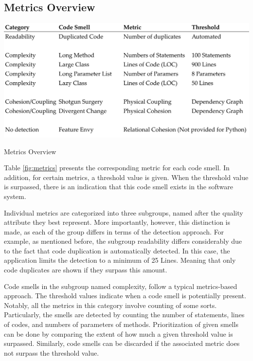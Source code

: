 \subsection{Metrics Overview}

\begin{table}[htp]
    \centering
    \includegraphics[width=\textwidth]{./assets/smell_overview}
    \label{fig:metrics}
    \caption{Metrics Overview}
\end{table}

Table \ref{fig:metrics} presents the corresponding metric for each code smell. In addition, for certain metrics, a threshold value is given. When the threshold value is surpassed, there is an indication that this code smell exists in the software system.

Individual metrics are categorized into three subgroups, named after the quality attribute they best represent. More importantly, however, this distinction is made, as each of the group differs in terms of the detection approach. For example, as mentioned before, the subgroup readability differs considerably due to the fact that code duplication is automatically detected. In this case, the application limits the detection to a minimum of 25 Lines. Meaning that only code duplicates are shown if they surpass this amount. 

Code smells in the subgroup named complexity, follow a typical metrics-based approach. The threshold values indicate when a code smell is potentially present. Notably, all the metrics in this category involve counting of some sorts. Particularly, the smells are detected by counting the number of statements, lines of codes, and numbers of parameters of methods. Prioritization of given smells can be done by comparing the extent of how much a given threshold value is surpassed. Similarly, code smells can be discarded if the associated metric does not surpass the threshold value. 

